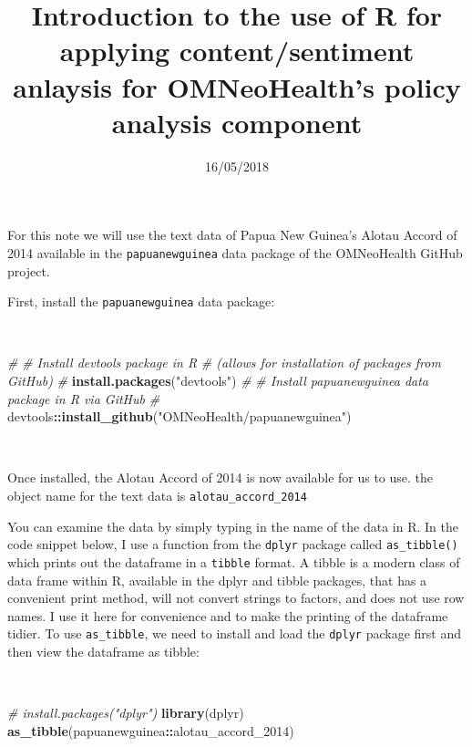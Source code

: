 \documentclass[11pt,a4paper]{article}
\title{Introduction to the use of R for applying content/sentiment anlaysis for
OMNeoHealth's policy analysis component}
\author{}
\date{16/05/2018}
\newenvironment{Shaded}{\begin{snugshade}}{\end{snugshade}}
\newcommand{\KeywordTok}[1]{\textcolor[rgb]{0.13,0.29,0.53}{\textbf{#1}}}
\newcommand{\DecValTok}[1]{\textcolor[rgb]{0.00,0.00,0.81}{#1}}
\newcommand{\StringTok}[1]{\textcolor[rgb]{0.31,0.60,0.02}{#1}}
\newcommand{\CommentTok}[1]{\textcolor[rgb]{0.56,0.35,0.01}{\textit{#1}}}
\newcommand{\OperatorTok}[1]{\textcolor[rgb]{0.81,0.36,0.00}{\textbf{#1}}}
\newcommand{\NormalTok}[1]{#1}
\begin{document}
\maketitle

For this note we will use the text data of Papua New Guinea's Alotau
Accord of 2014 available in the \texttt{papuanewguinea} data package of
the OMNeoHealth GitHub project.

First, install the \texttt{papuanewguinea} data package:

~

\begin{Shaded}
\begin{Highlighting}[]
\CommentTok{#}
\CommentTok{# Install devtools package in R }
\CommentTok{# (allows for installation of packages from GitHub)}
\CommentTok{#}
\KeywordTok{install.packages}\NormalTok{(}\StringTok{"devtools"}\NormalTok{)}
\CommentTok{#}
\CommentTok{# Install papuanewguinea data package in R via GitHub}
\CommentTok{#}
\NormalTok{devtools}\OperatorTok{::}\KeywordTok{install_github}\NormalTok{(}\StringTok{"OMNeoHealth/papuanewguinea"}\NormalTok{)}
\end{Highlighting}
\end{Shaded}

~

Once installed, the Alotau Accord of 2014 is now available for us to
use. the object name for the text data is \texttt{alotau\_accord\_2014}

You can examine the data by simply typing in the name of the data in R.
In the code snippet below, I use a function from the \texttt{dplyr}
package called \texttt{as\_tibble()} which prints out the dataframe in a
\texttt{tibble} format. A tibble is a modern class of data frame within
R, available in the dplyr and tibble packages, that has a convenient
print method, will not convert strings to factors, and does not use row
names. I use it here for convenience and to make the printing of the
dataframe tidier. To use \texttt{as\_tibble}, we need to install and
load the \texttt{dplyr} package first and then view the dataframe as
tibble:

~

\begin{Shaded}
\begin{Highlighting}[]
\CommentTok{# install.packages("dplyr")}
\KeywordTok{library}\NormalTok{(dplyr)}
\KeywordTok{as_tibble}\NormalTok{(papuanewguinea}\OperatorTok{::}\NormalTok{alotau_accord_}\DecValTok{2014}\NormalTok{)}
\end{Highlighting}
\end{Shaded}
\end{document}

